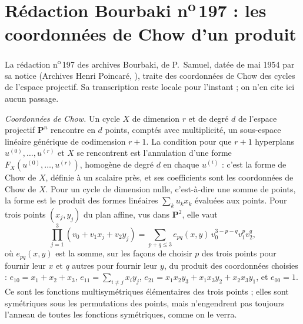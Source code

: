 \section[Rédaction Bourbaki n\textsuperscript{o}\,197 : coordonnées de Chow d'un produit]{Rédaction Bourbaki n\textsuperscript{o}\,197 : les coordonnées de Chow d'un produit\protect\piste\protect{}}\label{sec:bourbaki-197-chow}

La rédaction n\textsuperscript{o}\,197 des archives Bourbaki, de P.~Samuel, datée de mai 1954 par sa notice (Archives Henri Poincaré, ), traite des coordonnées de Chow des cycles de l'espace projectif. Sa transcription reste locale pour l'instant ; on n'en cite ici aucun passage.

\emph{Coordonnées de Chow.} Un cycle $X$ de dimension $r$ et de degré $d$ de l'espace projectif $\mathbf P^n$ rencontre en $d$ points, comptés avec multiplicité, un sous-espace linéaire générique de codimension $r+1$. La condition pour que $r+1$ hyperplans $u^{(0)}, \ldots, u^{(r)}$ et $X$ se rencontrent est l'annulation d'une forme $F_X(u^{(0)}, \ldots, u^{(r)})$, homogène de degré $d$ en chaque $u^{(i)}$ : c'est la forme de Chow de $X$, définie à un scalaire près, et ses coefficients sont les coordonnées de Chow de $X$. Pour un cycle de dimension nulle, c'est-à-dire une somme de points, la forme est le produit des formes linéaires $\sum_k u_k x_k$ évaluées aux points. Pour trois points $(x_j, y_j)$ du plan affine, vus dans $\mathbf P^2$, elle vaut
\[
\prod_{j=1}^3 (v_0 + v_1 x_j + v_2 y_j) = \sum_{p+q \leq 3} e_{pq}(x, y)\, v_0^{3-p-q} v_1^p v_2^q ,
\]
où $e_{pq}(x, y)$ est la somme, sur les façons de choisir $p$ des trois points pour fournir leur $x$ et $q$ autres pour fournir leur $y$, du produit des coordonnées choisies : $e_{10} = x_1 + x_2 + x_3$, $e_{11} = \sum_{i \neq j} x_i y_j$, $e_{21} = x_1x_2y_3 + x_1x_3y_2 + x_2x_3y_1$, et $e_{00} = 1$. Ce sont les fonctions multisymétriques élémentaires des trois points ; elles sont symétriques sous les permutations des points, mais n'engendrent pas toujours l'anneau de toutes les fonctions symétriques, comme on le verra.

